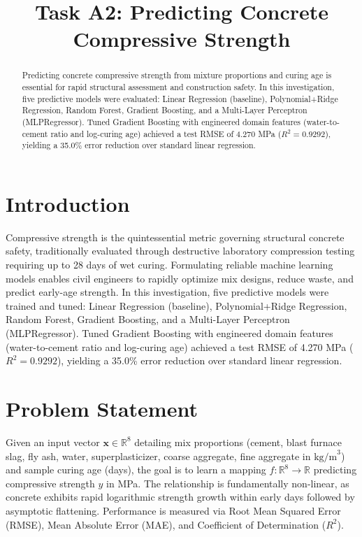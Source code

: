 \documentclass[conference]{IEEEtran}
\begin{document}
\title{Task A2: Predicting Concrete Compressive Strength}

\author{
}

\maketitle

\begin{abstract}
Predicting concrete compressive strength from mixture proportions and curing age is essential for rapid structural assessment and construction safety. In this investigation, five predictive models were evaluated: Linear Regression (baseline), Polynomial+Ridge Regression, Random Forest, Gradient Boosting, and a Multi-Layer Perceptron (MLPRegressor). Tuned Gradient Boosting with engineered domain features (water-to-cement ratio and log-curing age) achieved a test RMSE of 4.270 MPa ($R^2 = 0.9292$), yielding a 35.0\% error reduction over standard linear regression.
\end{abstract}

\section{Introduction}
Compressive strength is the quintessential metric governing structural concrete safety, traditionally evaluated through destructive laboratory compression testing requiring up to 28 days of wet curing. Formulating reliable machine learning models enables civil engineers to rapidly optimize mix designs, reduce waste, and predict early-age strength. In this investigation, five predictive models were trained and tuned: Linear Regression (baseline), Polynomial+Ridge Regression, Random Forest, Gradient Boosting, and a Multi-Layer Perceptron (MLPRegressor). Tuned Gradient Boosting with engineered domain features (water-to-cement ratio and log-curing age) achieved a test RMSE of 4.270 MPa ($R^2 = 0.9292$), yielding a 35.0\% error reduction over standard linear regression.

\section{Problem Statement}
Given an input vector $\mathbf{x} \in \mathbb{R}^8$ detailing mix proportions (cement, blast furnace slag, fly ash, water, superplasticizer, coarse aggregate, fine aggregate in $\text{kg/m}^3$) and sample curing age (days), the goal is to learn a mapping $f: \mathbb{R}^8 \to \mathbb{R}$ predicting compressive strength $y$ in MPa. The relationship is fundamentally non-linear, as concrete exhibits rapid logarithmic strength growth within early days followed by asymptotic flattening. Performance is measured via Root Mean Squared Error (RMSE), Mean Absolute Error (MAE), and Coefficient of Determination ($R^2$).
\end{document}
